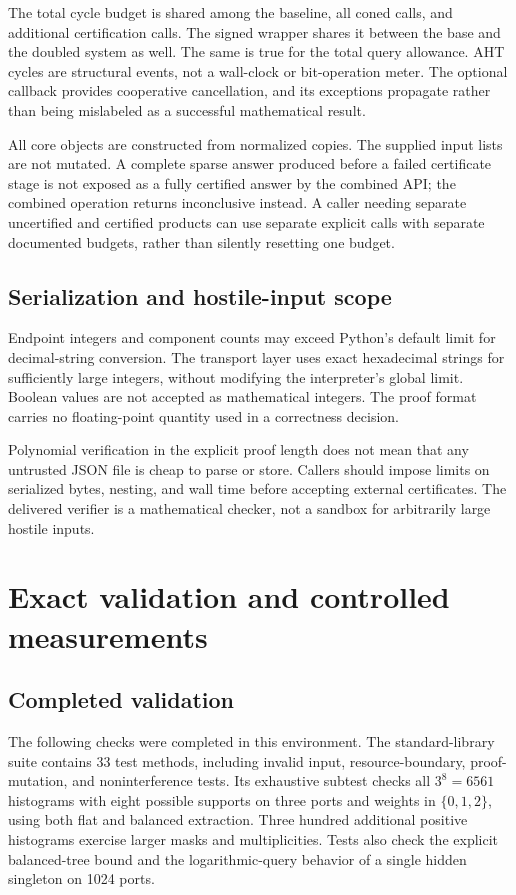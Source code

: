 \documentclass[11pt,letterpaper]{article}
\begin{document}
The total cycle budget is shared among the baseline, all coned calls, and
additional certification calls. The signed wrapper shares it between the base
and the doubled system as well. The same is true for the total query allowance.
AHT cycles are structural events, not a wall-clock or bit-operation meter.
The optional callback provides cooperative cancellation, and its exceptions
propagate rather than being mislabeled as a successful mathematical result.

All core objects are constructed from normalized copies. The supplied input
lists are not mutated. A complete sparse answer produced before a failed
certificate stage is not exposed as a fully certified answer by the combined
API; the combined operation returns inconclusive instead. A caller needing
separate uncertified and certified products can use separate explicit calls
with separate documented budgets, rather than silently resetting one budget.

\subsection{Serialization and hostile-input scope}
Endpoint integers and component counts may exceed Python's default limit for
decimal-string conversion. The transport layer uses exact hexadecimal strings
for sufficiently large integers, without modifying the interpreter's global
limit. Boolean values are not accepted as mathematical integers. The proof
format carries no floating-point quantity used in a correctness decision.

Polynomial verification in the explicit proof length does not mean that any
untrusted JSON file is cheap to parse or store. Callers should impose limits
on serialized bytes, nesting, and wall time before accepting external
certificates. The delivered verifier is a mathematical checker, not a sandbox
for arbitrarily large hostile inputs.

\section{Exact validation and controlled measurements}
\label{sec:experiments}

\subsection{Completed validation}
The following checks were completed in this environment. The standard-library
suite contains 33 test methods, including invalid input, resource-boundary,
proof-mutation, and noninterference tests. Its exhaustive subtest checks all
$3^8=6561$ histograms with eight possible supports on three ports and weights
in $\{0,1,2\}$, using both flat and balanced extraction. Three hundred additional
positive histograms exercise larger masks and multiplicities. Tests also check
the explicit balanced-tree bound and the logarithmic-query behavior of a
single hidden singleton on 1024 ports.
\end{document}
